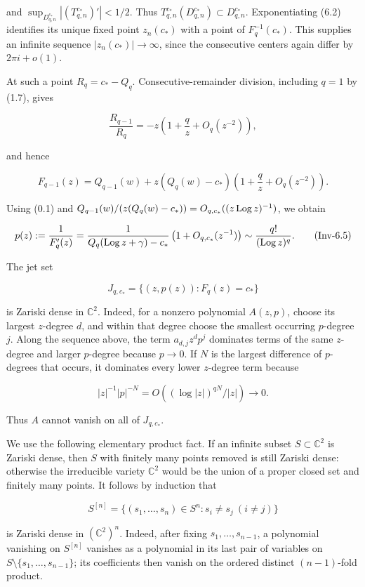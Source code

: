 and \(\sup_{D^{c_*}_{q,n}}|(T^{c_*}_{q,n})'|<1/2\). Thus
\(T^{c_*}_{q,n}(D^{c_*}_{q,n})\subset D^{c_*}_{q,n}\).
Exponentiating (6.2) identifies its unique
fixed point \(z_n(c_*)\) with a point of \(F_q^{-1}(c_*)\). This supplies
an infinite sequence \(|z_n(c_*)|\to\infty\), since the consecutive centers
again differ by \(2\pi i+o(1)\).

At such a point \(R_q=c_*-Q_q\). Consecutive-remainder division, including
\(q=1\) by (1.7), gives

\[
 \frac{R_{q-1}}{R_q}
 =-z\left(1+\frac qz+O_q(z^{-2})\right),
\]

and hence

\[
 F_{q-1}(z)=Q_{q-1}(w)
 +z(Q_q(w)-c_*)\left(1+\frac qz+O_q(z^{-2})\right).
\tag{Inv-6.4}
\]

Using (0.1) and
\(Q_{q-1}(w)/(z(Q_q(w)-c_*))=O_{q,c_*}((z\operatorname{Log} z)^{-1})\), we obtain

\[
 p(z):=\frac1{F_q'(z)}
 =\frac1{Q_q(\operatorname{Log} z+\gamma)-c_*}
  \left(1+O_{q,c_*}(z^{-1})\right)
 \sim\frac{q!}{(\operatorname{Log} z)^q}.
\tag{Inv-6.5}
\]

The jet set

\[
 J_{q,c_*}=\{(z,p(z)):F_q(z)=c_*\}
\]

is Zariski dense in \(\mathbb C^2\). Indeed, for a nonzero polynomial
\(A(z,p)\), choose its largest \(z\)-degree \(d\), and within that degree
choose the smallest occurring \(p\)-degree \(j\). Along the sequence above,
the term \(a_{d,j}z^dp^j\) dominates terms of the same \(z\)-degree and
larger \(p\)-degree because \(p\to0\). If \(N\) is the largest difference
of \(p\)-degrees that occurs, it dominates every lower \(z\)-degree term
because

\[
 |z|^{-1}|p|^{-N}=O((\log|z|)^{qN}/|z|)\longrightarrow0.
\]

Thus \(A\) cannot vanish on all of \(J_{q,c_*}\).

We use the following elementary product fact. If an infinite subset
\(S\subset\mathbb C^2\) is Zariski dense, then \(S\) with finitely many
points removed is still Zariski dense: otherwise the irreducible variety
\(\mathbb C^2\) would be the union of a proper closed set and finitely many
points. It follows by induction that

\[
 S^{[n]}=\{(s_1,\ldots,s_n)\in S^n:s_i\ne s_j\ (i\ne j)\}
\]

is Zariski dense in \((\mathbb C^2)^n\). Indeed, after fixing
\(s_1,\ldots,s_{n-1}\), a polynomial vanishing on \(S^{[n]}\) vanishes as a
polynomial in its last pair of variables on
\(S\setminus\{s_1,\ldots,s_{n-1}\}\); its coefficients then vanish on the
ordered distinct \((n-1)\)-fold product.

